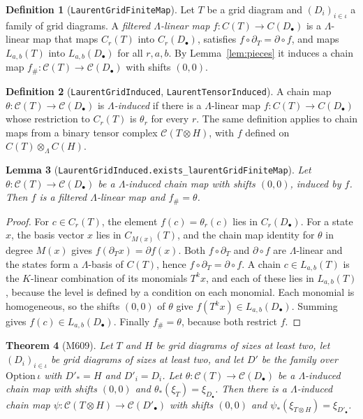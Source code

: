 \documentclass[11pt]{amsart}
\newtheorem{theorem}{Theorem}[section]
\newtheorem{lemma}[theorem]{Lemma}
\theoremstyle{definition}
\newtheorem{definition}[theorem]{Definition}
\theoremstyle{remark}
\newcommand{\lean}[1]{\textnormal{\nolinkurl{#1}}}
\newcommand{\Lam}{\Lambda}
\newcommand{\cC}{\mathcal{C}}
\newcommand{\Lev}{L}
\begin{document}
\begin{definition}[\lean{LaurentGridFiniteMap}]\label{def:laurent-map}
Let $T$ be a grid diagram and $(D_i)_{i\in\iota}$ a family of grid diagrams. A \emph{filtered
$\Lam$-linear map} $f\colon C(T)\to C(D_\bullet)$ is a $\Lam$-linear map that maps $C_r(T)$ into
$C_r(D_\bullet)$, satisfies $f\circ\partial_T=\partial\circ f$, and maps $\Lev_{a,b}(T)$ into
$\Lev_{a,b}(D_\bullet)$ for all $r,a,b$. By Lemma~\ref{lem:pieces} it induces a chain map
$f_\#\colon\cC(T)\to\cC(D_\bullet)$ with shifts $(0,0)$.
\end{definition}

\begin{definition}[\lean{LaurentGridInduced}, \lean{LaurentTensorInduced}]\label{def:induced}
A chain map $\theta\colon\cC(T)\to\cC(D_\bullet)$ is \emph{$\Lam$-induced} if there is a
$\Lam$-linear map $f\colon C(T)\to C(D_\bullet)$ whose restriction to $C_r(T)$ is $\theta_r$ for every
$r$. The same definition applies to chain maps from a binary tensor complex
$\cC(T\otimes H)$, with $f$ defined on $C(T)\otimes_\Lam C(H)$.
\end{definition}

\begin{lemma}[\lean{LaurentGridInduced.exists_laurentGridFiniteMap}]\label{lem:bridge}
Let $\theta\colon\cC(T)\to\cC(D_\bullet)$ be a $\Lam$-induced chain map with shifts $(0,0)$, induced by
$f$. Then $f$ is a filtered $\Lam$-linear map and $f_\#=\theta$.
\end{lemma}

\begin{proof}
For $c\in C_r(T)$, the element $f(c)=\theta_r(c)$ lies in $C_r(D_\bullet)$. For a state $x$, the basis
vector $x$ lies in $C_{M(x)}(T)$, and the chain map identity for $\theta$ in degree $M(x)$ gives
$f(\partial_Tx)=\partial f(x)$. Both $f\circ\partial_T$ and $\partial\circ f$ are $\Lam$-linear and the
states form a $\Lam$-basis of $C(T)$, hence $f\circ\partial_T=\partial\circ f$. A chain
$c\in\Lev_{a,b}(T)$ is the $K$-linear combination of its monomials $T^kx$, and each of these lies in
$\Lev_{a,b}(T)$, because the level is defined by a condition on each monomial. Each monomial is
homogeneous, so the shifts $(0,0)$ of $\theta$ give $f(T^kx)\in\Lev_{a,b}(D_\bullet)$. Summing gives
$f(c)\in\Lev_{a,b}(D_\bullet)$. Finally $f_\#=\theta$, because both restrict $f$.
\end{proof}

\begin{theorem}[M609]\label{thm:reassociation}
Let $T$ and $H$ be grid diagrams of sizes at least two, let $(D_i)_{i\in\iota}$ be grid diagrams of
sizes at least two, and let $D'$ be the family over $\mathrm{Option}\,\iota$ with $D'_*=H$ and
$D'_i=D_i$. Let $\theta\colon\cC(T)\to\cC(D_\bullet)$ be a $\Lam$-induced chain map with shifts
$(0,0)$ and $\theta_*(\xi_T)=\xi_{D_\bullet}$. Then there is a $\Lam$-induced chain map
$\psi\colon\cC(T\otimes H)\to\cC(D'_\bullet)$ with shifts $(0,0)$ and
$\psi_*(\xi_{T\otimes H})=\xi_{D'_\bullet}$.
\end{theorem}
\end{document}
